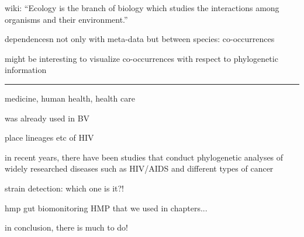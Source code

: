 wiki:
``Ecology is the branch of biology which studies the interactions among organisms and their environment.''

dependencesn not only with meta-data but between species: co-occurrences

\cite{Lima-Mendez2015,Villalobos2017,Zelezniak2015}

might be interesting to visualize co-occurrences with respect to phylogenetic information



\noindent\rule{\textwidth}{0.4pt}

medicine, human health, health care

was already used in BV

place lineages etc of HIV

in recent years, there have been studies that conduct
phylogenetic analyses of widely researched diseases such as HIV/AIDS \cite{Castro-Nallar2012,Brenner2013}
and different types of cancer \cite{Brown2017a,Abbosh2017}

strain detection: which one is it?!

hmp gut biomonitoring
\acf{HMP} \citep{Huttenhower2012,Methe2012}
that we used in chapters...

in conclusion, there is much to do!
